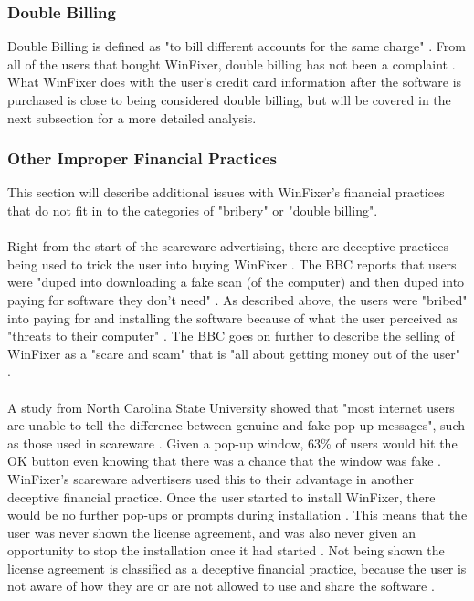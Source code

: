 \documentclass[11pt]{article}
\begin{document}
\begin{multicols}{2}
\subsubsection{Double Billing}
Double Billing is defined as "to bill different accounts for the same charge" \cite{dictionary}. From all of the users that bought WinFixer, double billing has not been a complaint \cite{bbcfighting} \cite{ftcorder}. What WinFixer does with the user's credit card information after the software is purchased is close to being considered double billing, but will be covered in the next subsection for a more detailed analysis.
\subsubsection{Other Improper Financial Practices}
This section will describe additional issues with WinFixer's financial practices that do not fit in to the categories of "bribery" or "double billing". \\
\vspace{10pt}\\
Right from the start of the scareware advertising, there are deceptive practices being used to trick the user into buying WinFixer \cite{bbcfighting}. The BBC reports that users were "duped into downloading a fake scan (of the computer) and then duped into paying for software they don't need" \cite{bbcfighting}. As described above, the users were "bribed" into paying for and installing the software because of what the user perceived as "threats to their computer" \cite{symantecwinfixer}\cite{mcafeewinfixer}. The BBC goes on further to describe the selling of WinFixer as a "scare and scam" that is "all about getting money out of the user" \cite{bbcfighting}.\\
\vspace{10pt}\\
A study from North Carolina State University showed that "most internet users are unable to tell the difference between genuine and fake pop-up messages", such as those used in scareware \cite{bbcfighting}. Given a pop-up window, 63\% of users would hit the OK button even knowing that there was a chance that the window was fake \cite{bbcfighting}. WinFixer's scareware advertisers used this to their advantage in another deceptive financial practice. Once the user started to install WinFixer, there would be no further pop-ups or prompts during installation \cite{badwarewinfixer}. This means that the user was never shown the license agreement, and was also never given an opportunity to stop the installation once it had started \cite{badwarewinfixer}. Not being shown the license agreement is classified as a deceptive financial practice, because the user is not aware of how they are or are not allowed to use and share the software \cite{badwarewinfixer}.\\

\end{multicols}
\end{document}
